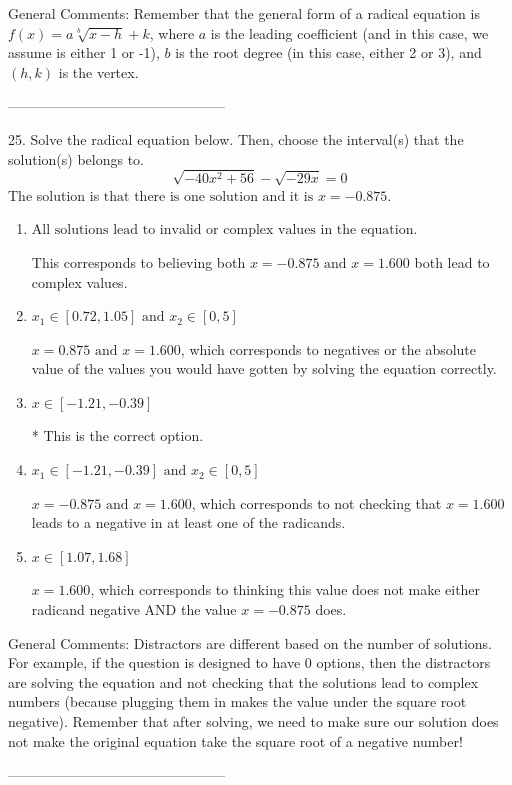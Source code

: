 \documentclass{extbook}[14pt]
\begin{document}
General Comments: Remember that the general form of a radical equation is $ f(x) = a \sqrt[b]{x - h} + k $, where $a$ is the leading coefficient (and in this case, we assume is either 1 or -1), $b$ is the root degree (in this case, either 2 or 3), and $(h, k)$ is the vertex.

-----------------------------------------------

25. Solve the radical equation below. Then, choose the interval(s) that the solution(s) belongs to.
\[ \sqrt{-40 x^2 + 56} - \sqrt{-29 x} = 0 \] 
The solution is $ \text{that there is one solution and it is } x = -0.875. $ 

\begin{enumerate}[label=\Alph*.] 
\item $ \text{All solutions lead to invalid or complex values in the equation.} $ 

 This corresponds to believing both $x = -0.875 \text{ and } x = 1.600$ both lead to complex values. 
\item $ x_1 \in [0.72, 1.05] \text{ and } x_2 \in [0,5] $ 

 $x = 0.875 \text{ and } x = 1.600$, which corresponds to negatives or the absolute value of the values you would have gotten by solving the equation correctly. 
\item $ x \in [-1.21,-0.39] $ 

 * This is the correct option. 
\item $ x_1 \in [-1.21, -0.39] \text{ and } x_2 \in [0,5] $ 

 $x = -0.875 \text{ and } x = 1.600$, which corresponds to not checking that $x = 1.600$ leads to a negative in at least one of the radicands. 
\item $ x \in [1.07,1.68] $ 

 $x = 1.600$, which corresponds to thinking this value does not make either radicand negative AND the value $x = -0.875$ does. 
\end{enumerate} 
 
General Comments: Distractors are different based on the number of solutions. For example, if the question is designed to have 0 options, then the distractors are solving the equation and not checking that the solutions lead to complex numbers (because plugging them in makes the value under the square root negative). Remember that after solving, we need to make sure our solution does not make the original equation take the square root of a negative number!

-----------------------------------------------
\end{document}
